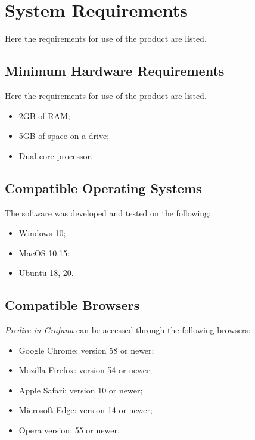 \section{System Requirements}
Here the requirements for use of the product are listed.

\subsection{Minimum Hardware Requirements}
Here the requirements for use of the product are listed.
\begin{itemize}
	\item 2GB of RAM;
	\item 5GB of space on a drive;
	\item Dual core processor.	
\end{itemize}

\subsection{Compatible Operating Systems}
The software was developed and tested on the following:
\begin{itemize}
	\item Windows 10;
	\item MacOS 10.15;
	\item Ubuntu 18, 20.
\end{itemize}

\subsection{Compatible Browsers}
\textit{Predire in Grafana} can be accessed through the following browsers:
\begin{itemize}
	\item Google Chrome: version 58 or newer;
	\item Mozilla Firefox: version 54 or newer;
	\item Apple Safari: version 10 or newer;
	\item Microsoft Edge: version 14 or newer;
	\item Opera version: 55 or newer.
\end{itemize}



